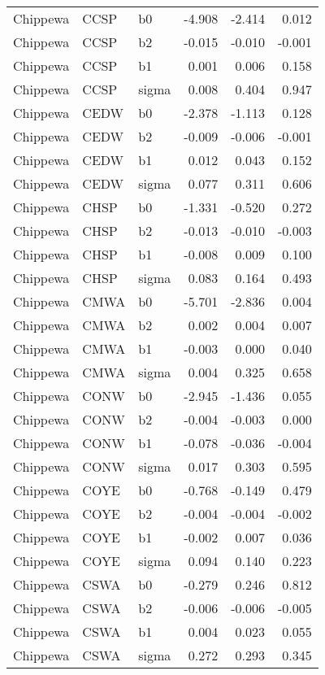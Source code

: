 \begin{table}[ht]
\begin{center}
\begin{tabular}{lllrrr}
  Chippewa & CCSP & b0 & -4.908 & -2.414 & 0.012 \\ 
  Chippewa & CCSP & b2 & -0.015 & -0.010 & -0.001 \\ 
  Chippewa & CCSP & b1 & 0.001 & 0.006 & 0.158 \\ 
  Chippewa & CCSP & sigma & 0.008 & 0.404 & 0.947 \\ 
  Chippewa & CEDW & b0 & -2.378 & -1.113 & 0.128 \\ 
  Chippewa & CEDW & b2 & -0.009 & -0.006 & -0.001 \\ 
  Chippewa & CEDW & b1 & 0.012 & 0.043 & 0.152 \\ 
  Chippewa & CEDW & sigma & 0.077 & 0.311 & 0.606 \\ 
  Chippewa & CHSP & b0 & -1.331 & -0.520 & 0.272 \\ 
  Chippewa & CHSP & b2 & -0.013 & -0.010 & -0.003 \\ 
  Chippewa & CHSP & b1 & -0.008 & 0.009 & 0.100 \\ 
  Chippewa & CHSP & sigma & 0.083 & 0.164 & 0.493 \\ 
  Chippewa & CMWA & b0 & -5.701 & -2.836 & 0.004 \\ 
  Chippewa & CMWA & b2 & 0.002 & 0.004 & 0.007 \\ 
  Chippewa & CMWA & b1 & -0.003 & 0.000 & 0.040 \\ 
  Chippewa & CMWA & sigma & 0.004 & 0.325 & 0.658 \\ 
  Chippewa & CONW & b0 & -2.945 & -1.436 & 0.055 \\ 
  Chippewa & CONW & b2 & -0.004 & -0.003 & 0.000 \\ 
  Chippewa & CONW & b1 & -0.078 & -0.036 & -0.004 \\ 
  Chippewa & CONW & sigma & 0.017 & 0.303 & 0.595 \\ 
  Chippewa & COYE & b0 & -0.768 & -0.149 & 0.479 \\ 
  Chippewa & COYE & b2 & -0.004 & -0.004 & -0.002 \\ 
  Chippewa & COYE & b1 & -0.002 & 0.007 & 0.036 \\ 
  Chippewa & COYE & sigma & 0.094 & 0.140 & 0.223 \\ 
  Chippewa & CSWA & b0 & -0.279 & 0.246 & 0.812 \\ 
  Chippewa & CSWA & b2 & -0.006 & -0.006 & -0.005 \\ 
  Chippewa & CSWA & b1 & 0.004 & 0.023 & 0.055 \\ 
  Chippewa & CSWA & sigma & 0.272 & 0.293 & 0.345 \\ 

\end{tabular}
\end{center}
\end{table}
